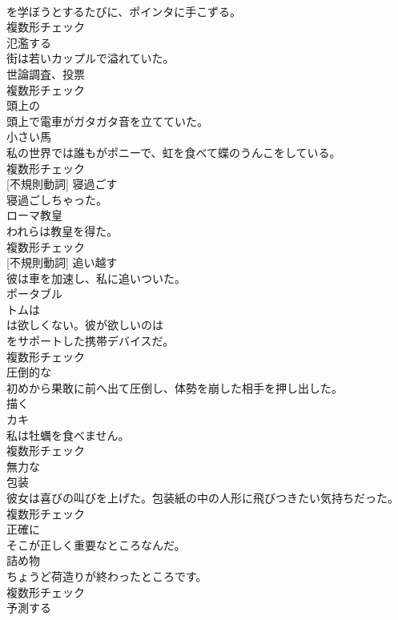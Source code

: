\documentclass[8pt]{extreport}
\begin{document}
\begin{CJK}{UTF8}{min}
\\	を学ぼうとするたびに、ポインタに手こずる。	
\\	複数形チェック
\\	[動詞]	氾濫する	
\\	街は若いカップルで溢れていた。	
\\	[名詞]	世論調査、投票	
\\	複数形チェック
\\	[形容詞]	頭上の	
\\	頭上で電車がガタガタ音を立てていた。	
\\	[名詞]	小さい馬	
\\	私の世界では誰もがポニーで、虹を食べて蝶のうんこをしている。	
\\	複数形チェック
\\	[動詞] [不規則動詞]	寝過ごす	
\\	寝過ごしちゃった。	
\\	[名詞]	ローマ教皇	
\\	われらは教皇を得た。	
\\	複数形チェック
\\	[動詞] [不規則動詞]	追い越す	
\\	彼は車を加速し、私に追いついた。	
\\	[名詞]	ポータブル	
\\	トムは
\\	は欲しくない。彼が欲しいのは
\\	をサポートした携帯デバイスだ。	
\\	複数形チェック
\\	[形容詞]	圧倒的な	
\\	初めから果敢に前へ出て圧倒し、体勢を崩した相手を押し出した。	
\\	[動詞]	描く	
\\	[名詞]	カキ	
\\	私は牡蠣を食べません。	
\\	複数形チェック
\\	[形容詞]	無力な	
\\	[名詞]	包装	
\\	彼女は喜びの叫びを上げた。包装紙の中の人形に飛びつきたい気持ちだった。	
\\	複数形チェック
\\	[副詞]	正確に	
\\	そこが正しく重要なところなんだ。	
\\	[名詞]	詰め物	
\\	ちょうど荷造りが終わったところです。	
\\	複数形チェック
\\	[動詞]	予測する	

\end{CJK}
\end{document}
